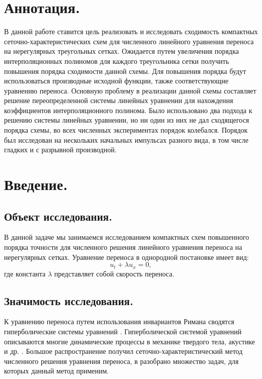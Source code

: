 \documentclass[14pt]{article}
\begin{document}
\section*{Аннотация.}
В данной работе ставится цель реализовать и исследовать сходимость компактных сеточно-характеристических схем для численного линейного уравнения переноса на нерегулярных треугольных сетках. Ожидается путем увеличения порядка интерполяционных полиномов для каждого треугольника сетки получить повышения порядка сходимости данной схемы. Для повышения порядка будут использоваться производные исходной функции, также соответствующие уравнению переноса. Основную проблему в реализации данной схемы составляет решение переопределенной системы линейных уравнении для нахождения коэффициентов интерполяционного полинома.
Было использовано два подхода к решению системы линейных уравнении, но ни один из них не дал сходящегося порядка схемы, во всех численных экспериментах порядок колебался. Порядок был исследован на нескольких начальных импульсах разного вида, в том числе гладких и с разрывной производной. %
\newpage
\tableofcontents



\newpage
\section*{Введение.}


\subsection*{Объект исследования.}
В данной задаче мы занимаемся исследованием компактных схем повышенного порядка точности для численного решения линейного уравнения переноса на нерегулярных сетках. Уравнение переноса в однородной постановке имеет вид:
\begin{equation}
u_{t} + \lambda u_{x} = 0,
\label{formula1}
\end{equation} 
где константа $\lambda$ представляет собой скорость переноса.

\subsection*{Значимость исследования.}
К уравнению переноса путем использования инвариантов Римана сводятся гиперболические системы уравнений \cite{1}. 
Гиперболической системой уравнений описываются многие динамические процессы в механике твердого тела, акустике и др. \cite{2}.  
Большое распространение получил сеточно-характеристический метод численного решения уравнения переноса, в \cite{3} разобрано множество задач, для которых данный метод применим. 
\end{document}
